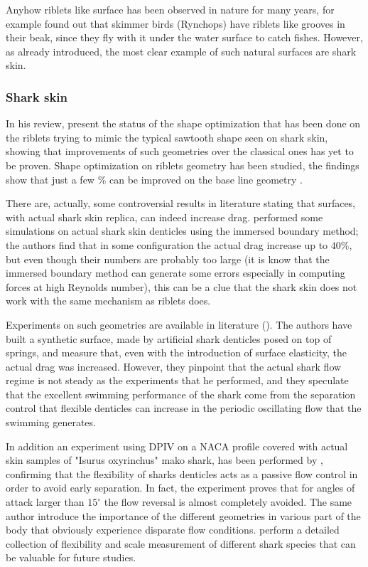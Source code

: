 Anyhow riblets like surface has been observed in nature for many years, for example \citet{Martin2016riblets} found out that skimmer birds (Rynchops) have riblets like grooves in their beak, since they fly with it under the water surface to catch fishes.
However, as already introduced, the most clear example of such natural surfaces are shark skin.

\subsubsection{Shark skin}
In his review, \citet{dean2010shark} present the status of the shape optimization that has been done on the riblets trying to mimic the typical sawtooth shape seen on shark skin, showing that improvements of such geometries over the classical ones has yet to be proven.
Shape optimization on riblets geometry has been studied, the findings show that just a few $\%$ can be improved on the base line geometry \citet{bechert1997experiments}.

There are, actually, some controversial results in literature stating that surfaces, with actual shark skin replica, can indeed increase drag.
\citet{boomsma2016direct} performed some simulations on actual shark skin denticles using the immersed boundary method; the authors find that in some configuration the actual drag increase up to $40\%$, but even though their numbers are probably too large (it is know that the immersed boundary method can generate some errors especially in computing forces at high Reynolds number), this can be a clue that the shark skin does not work with the same mechanism as riblets does.

Experiments on such geometries are available in literature (\citet{bechert1997natural}).
The authors have built a synthetic surface, made by artificial shark denticles posed on top of springs, and measure that, even with the introduction of surface elasticity, the actual drag was increased.
However, they pinpoint that the actual shark flow regime is not steady as the experiments that he performed, and they speculate that the excellent swimming performance of the shark come from the separation control that flexible denticles can increase in the periodic oscillating flow that the swimming generates.

In addition an experiment using DPIV on a NACA profile covered with actual skin samples of "Isurus oxyrinchus" mako shark, has been performed by \citet{lang2014SharkControl}, confirming that the flexibility of sharks denticles acts as a passive flow control in order to avoid early separation.
In fact, the experiment proves that for angles of attack larger than $15^{\circ}$ the flow reversal is almost completely avoided.
The same author introduce the importance of the different geometries in various part of the body that obviously experience disparate flow conditions.
\citet{motta2012Shark} perform a detailed collection of flexibility and scale measurement of different shark species that can be valuable for future studies.

